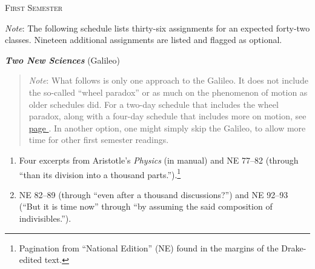 \documentclass[10pt]{article}
\begin{document}




\newpage

\begin{center}
  \textsc{\small{First Semester}}
\end{center} 
\label{First}
{\small \emph{Note}: The following schedule 
lists thirty-six assignments for an expected forty-two classes.
Nineteen additional assignments are listed and flagged as optional.

}

\textbf{\emph{Two New Sciences}} (Galileo)
\vspace{-0.2em}
  \begin{quote}
    \small{\emph{Note}: What follows is only one approach to the Galileo.
    It does not include the so-called ``wheel paradox'' 
    or as much on the phenomenon of motion 
    as older schedules did.  
    For a two-day schedule that includes 
    the wheel paradox, along with a four-day schedule
    that includes more on motion,
    see \hyperref[Galileo]{page \pageref{Galileo}}.
    In another option, one might simply skip the Galileo,
    to allow more time for other first semester readings.
    
    } 
  \end{quote}
  \begin{enumerate}[noitemsep]
    \item Four excerpts from Aristotle's \emph{Physics}
		(in manual) and NE 77--82 (through ``than
		its division into a thousand
		parts.'').\footnote{Pagination from
			``National Edition'' (NE) found in
			the margins of the Drake-edited
			text.} \item  NE 82--89 (through
		``even after a thousand discussions?'') and
		NE 92--93 (``But it is time now'' through
		``by assuming the said composition of
		indivisibles.'').  \end{enumerate}
\end{document}
